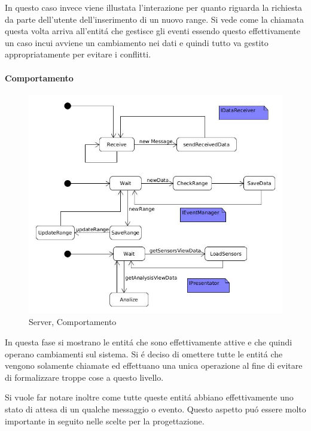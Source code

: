 In questo caso invece viene illustata l'interazione per quanto riguarda la richiesta da parte dell'utente dell'inserimento di un nuovo range. Si vede come la chiamata questa volta arriva all'entit\'a che gestisce gli eventi essendo questo effettivamente un caso incui avviene un cambiamento nei dati e quindi tutto va gestito appropriatamente per evitare i conflitti.

\paragraph{Comportamento}

\begin{figure}[h]
\centering
\includegraphics[width=\textwidth]{Figures/DomainModel/Server/Behaviour}
\caption{Server, Comportamento}
\end{figure}


In questa fase si mostrano le entit\'a che sono effettivamente attive e che quindi operano cambiamenti sul sistema. Si \'e deciso di omettere tutte le entit\'a che vengono solamente chiamate ed effettuano una unica operazione al fine di evitare di formalizzare troppe cose a questo livello.

Si vuole far notare inoltre come tutte queste entit\'a abbiano effettivamente uno stato di attesa di un qualche messaggio o evento. Questo aspetto pu\'o essere molto importante in seguito nelle scelte per la progettazione.

\newpage

